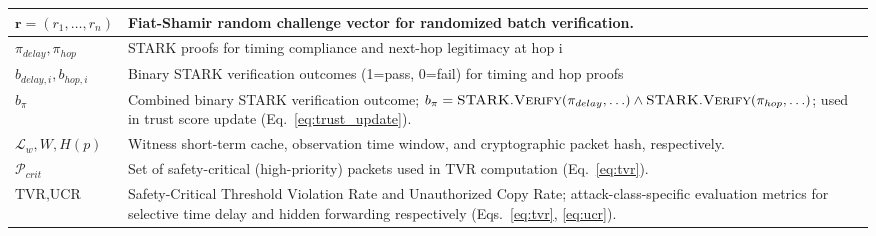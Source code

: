 \documentclass[12pt, a4paper]{report}
\begin{document}
\begin{table}[H]
\begin{center}
\begin{tabular}{| m{2.50cm} | m{8.5cm} |}
                        \hline
                        $\mathbf{r} = (r_1, \ldots, r_n)$ & Fiat-Shamir random challenge vector 
                        for randomized batch verification. \\
                        \hline
                        $\pi_{delay}, \pi_{hop}$ & STARK proofs for timing compliance and next-hop legitimacy at hop i 
                        \\
                         \hline
                         $b_{delay,i}, b_{hop,i}$ &
                        Binary STARK verification outcomes (1=pass, 0=fail) for timing and hop proofs \\
                        \hline
                        $b_\pi$ & Combined binary STARK verification outcome;
                        $b_\pi = \textsc{STARK.Verify}(\pi_{delay},\ldots)
                        \land \textsc{STARK.Verify}(\pi_{hop},\ldots)$;
                        used in trust score update
                        (Eq.~\ref{eq:trust_update}). \\

                        \hline
                        $\mathcal{L}_w, W, H(p)$ & Witness short-term cache, observation time window, and cryptographic packet hash, respectively. \\

                        \hline
                       $\mathcal{P}_{crit}$ &
                        Set of safety-critical (high-priority) packets
                        used in TVR computation
                          (Eq.~\ref{eq:tvr}). \\
                        \hline
                        $\text{TVR}, \text{UCR}$ &
                        Safety-Critical Threshold Violation Rate and
                        Unauthorized Copy Rate; attack-class-specific
                        evaluation metrics for selective time delay
                        and hidden forwarding respectively
                        (Eqs.~\ref{eq:tvr}, \ref{eq:ucr}). \\   
                        

\end{tabular}
\end{center}
\end{table}
\end{document}
